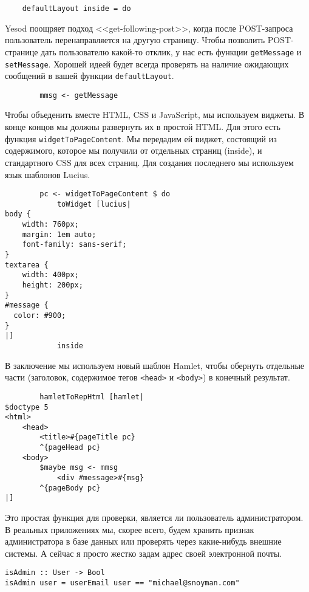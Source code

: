 \begin{lstlisting}
    defaultLayout inside = do
\end{lstlisting}
 
Yesod поощряет подход <<get-following-post>>, когда после POST-запроса пользователь перенаправляется на другую страницу. Чтобы позволить POST-странице дать пользователю какой-то отклик, у нас есть функции \lstinline!getMessage! и \lstinline!setMessage!. Хорошей идеей будет всегда проверять на наличие ожидающих сообщений в вашей функции \lstinline!defaultLayout!. 
 
\begin{lstlisting}
        mmsg <- getMessage
\end{lstlisting}
 
Чтобы объеденить вместе HTML, CSS и JavaScript, мы используем виджеты. В конце концов мы должны развернуть их в простой HTML. Для этого есть функция \lstinline!widgetToPageContent!. Мы передадим ей виджет, состоящий из содержимого, которое мы получили от отдельных страниц (inside), и стандартного CSS для всех страниц. Для создания последнего мы используем язык шаблонов Lucius. 
 
\begin{lstlisting}
        pc <- widgetToPageContent $ do
            toWidget [lucius|
body {
    width: 760px;
    margin: 1em auto;
    font-family: sans-serif;
}
textarea {
    width: 400px;
    height: 200px;
}
#message {
  color: #900;
}
|]
            inside
\end{lstlisting}%
 
В заключение мы используем новый шаблон Hamlet, чтобы обернуть отдельные части (заголовок, содержимое тегов \lstinline!<head>! и \lstinline!<body>!) в конечный результат. 
 
\begin{lstlisting}
        hamletToRepHtml [hamlet|
$doctype 5
<html>
    <head>
        <title>#{pageTitle pc}
        ^{pageHead pc}
    <body>
        $maybe msg <- mmsg
            <div #message>#{msg}
        ^{pageBody pc}
|]
\end{lstlisting}
 
Это простая функция для проверки, является ли пользователь администратором. В реальных приложениях мы, скорее всего, будем хранить признак администратора в базе данных или проверять через какие-нибудь внешние системы. А сейчас я просто жестко задам адрес своей электронной почты. 
 
\begin{lstlisting}
isAdmin :: User -> Bool
isAdmin user = userEmail user == "michael@snoyman.com"
\end{lstlisting}
 
